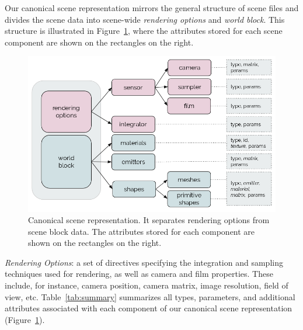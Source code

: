 

Our canonical scene representation mirrors the general structure of scene files and divides the scene data into
scene-wide {\it rendering options} and {\it world block}. 
This structure is illustrated in Figure~\ref{fig:canonicalrep}, where the attributes stored for each scene component are shown on the rectangles on the right.

\begin{figure}[h]
\centering
\includegraphics[width=0.9\linewidth]{figs/3_system_architecture/canonicalrep.png}
\caption{Canonical scene representation. It separates rendering options from scene block data. The attributes stored for each component are shown on the rectangles on the right.}
\label{fig:canonicalrep}
\end{figure}

\noindent \textit{Rendering Options}:
a set of directives specifying the integration and sampling techniques used for
rendering, as well as camera and film properties. These include, for instance, camera position, camera matrix, image resolution, field of view, etc.
Table~\ref{tab:summary} summarizes all types, parameters, and additional attributes associated with each component of our canonical scene representation (Figure~\ref{fig:canonicalrep}). 

